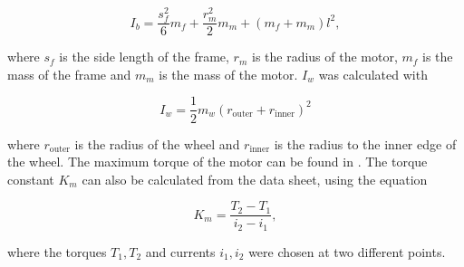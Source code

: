 \begin{equation}\label{eq:Ib}
    I_{b} = \frac{s_{f}^2}{6}m_{f} + \frac{r_{m}^2}{2}m_{m} + (m_{f} + m_{m})l^2,
\end{equation}

\noindent
where $s_{f}$ is the side length of the frame, $r_{m}$ is the radius of the motor, $m_{f}$ is the mass of the frame and $m_{m}$ is the mass of the motor. $I_w$ was calculated with

\begin{equation}\label{eq:Iw}
    I_{w} = \frac{1}{2}m_{w}(r_{\text{outer}}+r_{\text{inner}})^2
\end{equation}

\noindent
where $r_{\text{outer}}$ is the radius of the wheel and $r_{\text{inner}}$ is the radius to the inner edge of the wheel. The maximum torque of the motor can be found in \cite{motor-datasheet}. The torque constant $K_{m}$ can also be calculated from the data sheet, using the equation

\begin{equation}\label{eq:Km}
    K_{m} = \frac{T_{2} - T_{1}}{i_{2} - i_{1}},
\end{equation}

\noindent
where the torques $T_1, T_2$ and currents $i_1, i_2$ were chosen at two different points.
